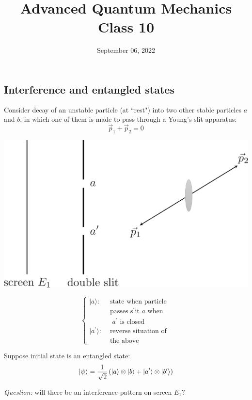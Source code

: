 \documentclass[12pt]{article}
\title{Advanced Quantum Mechanics\\Class 10}
\date{September 06, 2022}                                           %
\newcommand{\be}{\begin{equation}}
\newcommand{\ee}{\end{equation}}
\begin{document}
\maketitle

\subsection{Interference and entangled states}

Consider decay of an unstable particle (at
``rest") into two other stable particles $a$ and $b$, in which
one of them is made to pass through a Young's
slit apparatus:
\be
\vec{p}_1 + \vec{p}_2 = 0
\ee

\begin{minipage}{0.5\textwidth}
\includegraphics[width=\textwidth]{Figures/DoubleSlitEntangled.pdf}
\end{minipage}%
\begin{minipage}{0.5\textwidth}
\[
\left\{
\begin{aligned}
|a\rangle: & \text { state when particle } \\ 
& \text { passes slit $a$ when } \\ 
& \text { $a^{\prime}$ is closed } \\
|a^{\prime}\rangle:
& \text { reverse situation of } \\
& \text { the above } 
\end{aligned}
\right.
\]
\end{minipage}

Suppose initial state is an entangled state:
\be
\ket{\psi} = \frac{1}{\sqrt{2}}
\left(
\ket{a}\otimes\ket{b} + \ket{a^\prime}\otimes\ket{b^\prime}
\right)
\ee

\emph{Question:} will there be an interference pattern
on screen \(E_{1}\)?
\end{document}
